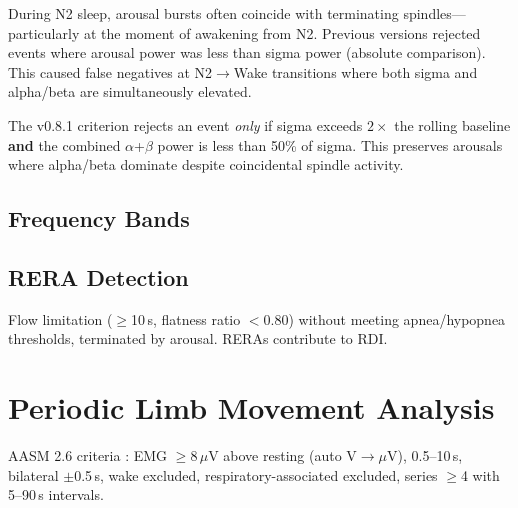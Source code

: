 \documentclass[11pt,a4paper,twocolumn]{article}
\begin{document}
During N2 sleep, arousal bursts often coincide with terminating spindles---particularly at the moment of awakening from N2. Previous versions rejected events where arousal power was less than sigma power (absolute comparison). This caused false negatives at N2$\to$Wake transitions where both sigma and alpha/beta are simultaneously elevated.

The v0.8.1 criterion rejects an event \emph{only} if sigma exceeds $2\times$ the rolling baseline \textbf{and} the combined $\alpha$+$\beta$ power is less than 50\% of sigma. This preserves arousals where alpha/beta dominate despite coincidental spindle activity.

\subsection{Frequency Bands}

\begin{table}[H]
\centering\small
\caption{Arousal detection bands}
\end{table}

\subsection{RERA Detection}

Flow limitation ($\geq$10\,s, flatness ratio $< 0.80$) without meeting apnea/hypopnea thresholds, terminated by arousal. RERAs contribute to RDI.


\section{Periodic Limb Movement Analysis}

AASM 2.6 criteria \cite{berry2020,zucconi2006}: EMG $\geq$8\,$\mu$V above resting (auto V$\to\mu$V), 0.5--10\,s, bilateral $\pm$0.5\,s, wake excluded, respiratory-associated excluded, series $\geq$4 with 5--90\,s intervals.
\end{document}
